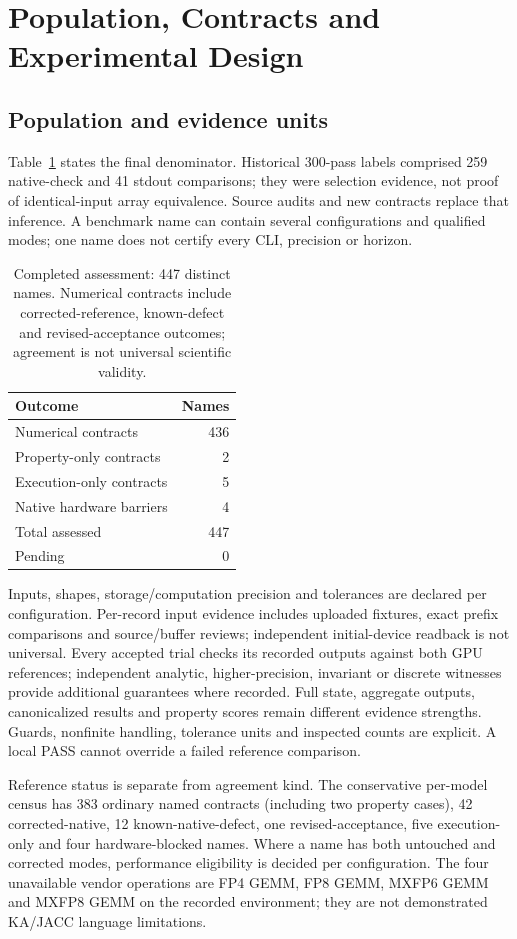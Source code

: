 \section{Population, Contracts and Experimental Design}
\label{sec:methodology}
\subsection{Population and evidence units}
Table~\ref{tab:final-population} states the final denominator. Historical 300-pass labels comprised 259 native-check and 41 stdout comparisons; they were selection evidence, not proof of identical-input array equivalence. Source audits and new contracts replace that inference. A benchmark name can contain several configurations and qualified modes; one name does not certify every CLI, precision or horizon.
\begin{table}[t]\centering\small
\caption{Completed assessment: 447 distinct names. Numerical contracts include corrected-reference, known-defect and revised-acceptance outcomes; agreement is not universal scientific validity.}\label{tab:final-population}
\begin{tabular}{lr}\toprule Outcome & Names\\\midrule
Numerical contracts &436\\Property-only contracts &2\\Execution-only contracts &5\\Native hardware barriers &4\\\midrule Total assessed &447\\Pending &0\\\bottomrule\end{tabular}
\end{table}

Inputs, shapes, storage/computation precision and tolerances are declared per configuration. Per-record input evidence includes uploaded fixtures, exact prefix comparisons and source/buffer reviews; independent initial-device readback is not universal. Every accepted trial checks its recorded outputs against both GPU references; independent analytic, higher-precision, invariant or discrete witnesses provide additional guarantees where recorded. Full state, aggregate outputs, canonicalized results and property scores remain different evidence strengths. Guards, nonfinite handling, tolerance units and inspected counts are explicit. A local PASS cannot override a failed reference comparison.

Reference status is separate from agreement kind. The conservative per-model census has 383 ordinary named contracts (including two property cases), 42 corrected-native, 12 known-native-defect, one revised-acceptance, five execution-only and four hardware-blocked names. Where a name has both untouched and corrected modes, performance eligibility is decided per configuration. The four unavailable vendor operations are FP4 GEMM, FP8 GEMM, MXFP6 GEMM and MXFP8 GEMM on the recorded environment; they are not demonstrated KA/JACC language limitations.


